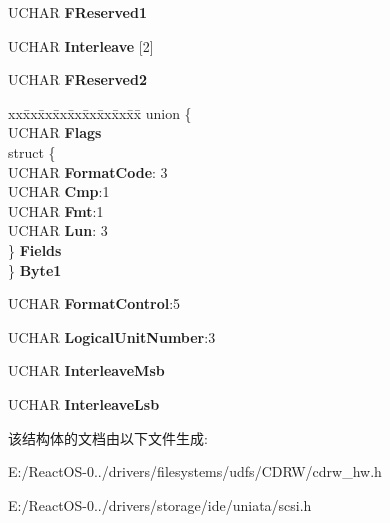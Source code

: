 \begin{DoxyCompactItemize}
\begin{tabbing}
\end{tabbing}\item 
\mbox{\label{struct___c_d_b_1_1___c_d_b6_f_o_r_m_a_t_ad61898efa71a14c8eda028980fe303f1}} 
U\+C\+H\+AR {\bfseries F\+Reserved1}
\item 
\mbox{\label{struct___c_d_b_1_1___c_d_b6_f_o_r_m_a_t_a469a46c25f58e5abae72844cc004045c}} 
U\+C\+H\+AR {\bfseries Interleave} \mbox{[}2\mbox{]}
\item 
\mbox{\label{struct___c_d_b_1_1___c_d_b6_f_o_r_m_a_t_a3b550d649f75086a5d86cbf8f6c46625}} 
U\+C\+H\+AR {\bfseries F\+Reserved2}
\item 
\mbox{\label{struct___c_d_b_1_1___c_d_b6_f_o_r_m_a_t_a1d3f9798f4f3ccd91734fec695e1cfc0}} 
\begin{tabbing}
xx\=xx\=xx\=xx\=xx\=xx\=xx\=xx\=xx\=\kill
union \{\\
\>UCHAR {\bfseries Flags}\\
\>struct \{\\
\>\>UCHAR {\bfseries FormatCode}: 3\\
\>\>UCHAR {\bfseries Cmp}:1\\
\>\>UCHAR {\bfseries Fmt}:1\\
\>\>UCHAR {\bfseries Lun}: 3\\
\>\} {\bfseries Fields}\\
\} {\bfseries Byte1}\\

\end{tabbing}\item 
\mbox{\label{struct___c_d_b_1_1___c_d_b6_f_o_r_m_a_t_a5ddcc58929b8e42f7283716b080a073f}} 
U\+C\+H\+AR {\bfseries Format\+Control}\+:5
\item 
\mbox{\label{struct___c_d_b_1_1___c_d_b6_f_o_r_m_a_t_a1e7434deb08cfc1892a86ba84de177ba}} 
U\+C\+H\+AR {\bfseries Logical\+Unit\+Number}\+:3
\item 
\mbox{\label{struct___c_d_b_1_1___c_d_b6_f_o_r_m_a_t_a302470c704a954caf40a17787f2b45ff}} 
U\+C\+H\+AR {\bfseries Interleave\+Msb}
\item 
\mbox{\label{struct___c_d_b_1_1___c_d_b6_f_o_r_m_a_t_ae0888c7ddf4efef09108afe24613cf37}} 
U\+C\+H\+AR {\bfseries Interleave\+Lsb}
\end{DoxyCompactItemize}


该结构体的文档由以下文件生成\+:\begin{DoxyCompactItemize}
\item 
E\+:/\+React\+O\+S-\/0../drivers/filesystems/udfs/\+C\+D\+R\+W/cdrw\+\_\+hw.\+h\item 
E\+:/\+React\+O\+S-\/0../drivers/storage/ide/uniata/scsi.\+h\end{DoxyCompactItemize}
